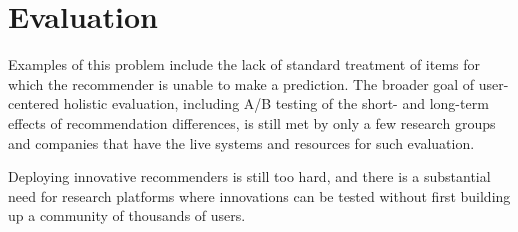 








\section{Evaluation}

\cite{martin2009recsys}
Examples of this problem
include the lack of standard treatment of items for which
the recommender is unable to make a prediction. The broader
goal of user-centered holistic evaluation, including A/B testing
of the short- and long-term effects of recommendation differences,
is still met by only a few research groups and companies
that have the live systems and resources for such evaluation.

Deploying innovative recommenders is still too hard, and there is a substantial need for research platforms where innovations can be tested without first building up a community of thousands of users. 